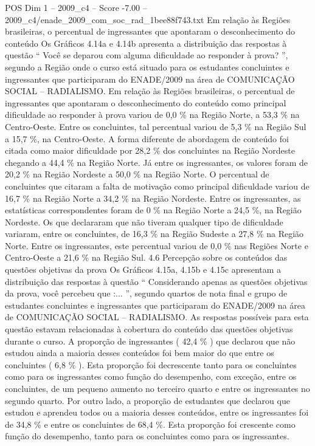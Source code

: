 \begin{textsample}{POS Dim 1 – 2009\_c4 – Score -7.00 – 2009\_c4/enade\_2009\_com\_soc\_rad\_1bee88f743.txt}
Em relação às Regiões brasileiras, o percentual de ingressantes que apontaram o desconhecimento do conteúdo Os Gráficos 4.14a e 4.14b apresenta a distribuição das respostas à questão “ Você se deparou com alguma dificuldade ao responder à prova? ”, segundo a Região onde o curso está situado para os estudantes concluintes e ingressantes que participaram do ENADE/2009 na área de COMUNICAÇÃO SOCIAL – RADIALISMO.
Em relação às Regiões brasileiras, o percentual de ingressantes que apontaram o desconhecimento do conteúdo como principal dificuldade ao responder à prova variou de 0,0 \% na Região Norte, a 53,3 \% na Centro-Oeste.
Entre os concluintes, tal percentual variou de 5,3 \% na Região Sul a 15,7 \%, na Centro-Oeste.
A forma diferente de abordagem de conteúdo foi citada como maior dificuldade por 28,2 \% dos concluintes na Região Nordeste chegando a 44,4 \% na Região Norte.
Já entre os ingressantes, os valores foram de 20,2 \% na Região Nordeste a 50,0 \% na Região Norte.
O percentual de concluintes que citaram a falta de motivação como principal dificuldade variou de 16,7 \% na Região Norte a 34,2 \% na Região Nordeste.
Entre os ingressantes, as estatísticas correspondentes foram de 0 \% na Região Norte a 24,5 \%, na Região Nordeste.
Os que declararam que não tiveram qualquer tipo de dificuldade variaram, entre os concluintes, de 16,3 \% na Região Sudeste a 27,8 \% na Região Norte.
Entre os ingressantes, este percentual variou de 0,0 \% nas Regiões Norte e Centro-Oeste a 21,6 \% na Região Sul. 4.6 Percepção sobre os conteúdos das questões objetivas da prova Os Gráficos 4.15a, 4.15b e 4.15c apresentam a distribuição das respostas à questão “ Considerando apenas as questões objetivas da prova, você percebeu que :... ”, segundo quartos de nota final e grupo de estudantes concluintes e ingressantes que participaram do ENADE/2009 na área de COMUNICAÇÃO SOCIAL – RADIALISMO.
As respostas possíveis para esta questão estavam relacionadas à cobertura do conteúdo das questões objetivas durante o curso.
A proporção de ingressantes ( 42,4 \% ) que declarou que não estudou ainda a maioria desses conteúdos foi bem maior do que entre os concluintes ( 6,8 \% ).
Esta proporção foi decrescente tanto para os concluintes como para os ingressantes como função do desempenho, com exceção, entre os concluintes, de um pequeno aumento no terceiro quarto e entre os ingressantes no segundo quarto.
Por outro lado, a proporção de estudantes que declarou que estudou e aprendeu todos ou a maioria desses conteúdos, entre os ingressantes foi de 34,8 \% e entre os concluintes de 68,4 \%.
Esta proporção foi crescente como função do desempenho, tanto para os concluintes como para os ingressantes.

\end{textsample}
